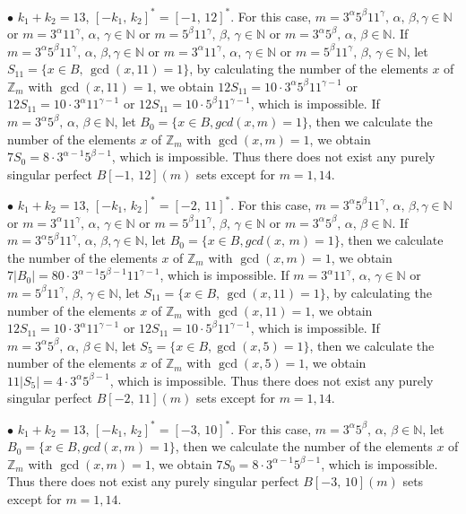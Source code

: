 \documentclass[12pt]{article}
\newtheorem{open problem}{Open problem}[section]
\begin{document}
$\bullet$ $k_1+k_2=13$, $[-k_1, \,k_2]^*=[-1, \,12]^*$. For this case, $m=3^\alpha5^\beta11^\gamma, \, \alpha, \, \beta, \gamma\in\mathbb{N}$ or $m=3^\alpha11^\gamma, \, \alpha, \, \gamma\in\mathbb{N}$ or $m=5^\beta11^\gamma, \,  \beta, \, \gamma\in\mathbb{N}$ or $m=3^\alpha5^\beta, \, \alpha, \, \beta\in\mathbb{N}$. If $m=3^\alpha5^\beta11^\gamma, \, \alpha, \, \beta, \gamma\in\mathbb{N}$ or $m=3^\alpha11^\gamma, \, \alpha, \, \gamma\in\mathbb{N}$ or $m=5^\beta11^\gamma, \,  \beta, \, \gamma\in\mathbb{N}$, let $S_{11}=\{x\in B, \, \gcd(x, 11)=1\}$, by calculating the number of the elements $x$ of $\mathbb{Z}_m$ with $\gcd(x, 11)=1$, we obtain $12S_{11}= 10\cdot 3^\alpha5^\beta11^{\gamma-1}$ or $12S_{11}= 10\cdot 3^\alpha11^{\gamma-1}$ or $12S_{11}= 10\cdot5^\beta11^{\gamma-1}$, which is impossible. If $m=3^\alpha5^\beta, \, \alpha, \, \beta\in\mathbb{N}$, let $B_0=\{x\in B, gcd(x, m)=1\}$, then we calculate the number of the elements $x$ of $\mathbb{Z}_m$ with $\gcd(x, m)=1$, we obtain $7S_0= 8\cdot 3^{\alpha-1}5^{\beta-1}$, which is impossible. Thus there does not exist any purely singular perfect $B[-1, \,12](m)$ sets except for $m=1, 14$.

$\bullet$ $k_1+k_2=13$, $[-k_1, \,k_2]^*=[-2, \,11]^*$. For this case, $m=3^\alpha5^\beta11^\gamma, \, \alpha, \, \beta, \gamma\in\mathbb{N}$ or $m=3^\alpha11^\gamma, \, \alpha, \, \gamma\in\mathbb{N}$ or $m=5^\beta11^\gamma, \,  \beta, \, \gamma\in\mathbb{N}$ or $m=3^\alpha5^\beta, \, \alpha, \, \beta\in\mathbb{N}$. If $m=3^\alpha5^\beta11^\gamma, \, \alpha, \, \beta, \gamma\in\mathbb{N}$, let $B_0=\{x\in B, gcd(x,   \,m)=1\}$, then we calculate the number of the elements $x$ of $\mathbb{Z}_m$ with $\gcd(x, m)=1$, we obtain $7|B_0|= 80\cdot 3^{\alpha-1}5^{\beta-1}11^{\gamma-1}$, which is impossible. If $m=3^\alpha11^\gamma, \, \alpha, \, \gamma\in\mathbb{N}$ or $m=5^\beta11^\gamma, \,  \beta, \, \gamma\in\mathbb{N}$, let $S_{11}=\{x\in B, \, \gcd(x, 11)=1\}$, by calculating the number of the elements $x$ of $\mathbb{Z}_m$ with $\gcd(x, 11)=1$, we obtain $12S_{11}= 10\cdot 3^\alpha11^{\gamma-1}$ or  $12S_{11}= 10\cdot5^\beta11^{\gamma-1}$, which is impossible. If $m=3^\alpha5^\beta, \, \alpha, \, \beta\in\mathbb{N}$, let $S_5=\{x\in B, \gcd(x, 5)=1\}$, then we calculate the number of the elements $x$ of $\mathbb{Z}_m$ with $\gcd(x, 5)=1$, we obtain $11|S_5|= 4\cdot 3^\alpha5^{\beta-1}$, which is impossible.
Thus there does not exist any purely singular perfect $B[-2, \,11](m)$ sets except for $m=1, 14$.


$\bullet$ $k_1+k_2=13$, $[-k_1, \,k_2]^*=[-3, \,10]^*$. For this case, $m=3^\alpha5^\beta, \, \alpha, \, \beta\in\mathbb{N}$, let $B_0=\{x\in B, gcd(x, m)=1\}$, then we calculate the number of the elements $x$ of $\mathbb{Z}_m$ with $\gcd(x, m)=1$, we obtain $7S_0= 8\cdot 3^{\alpha-1}5^{\beta-1}$, which is impossible.
Thus there does not exist any purely singular perfect $B[-3, \,10](m)$ sets except for $m=1, 14$.
\end{document}
